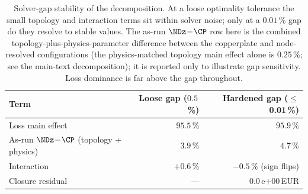 \begin{table}[t]
\centering
\caption{Solver-gap stability of the decomposition. At a loose optimality tolerance the
small topology and interaction terms sit within solver noise; only at a
$0.01$\,\% gap do they resolve to stable values. The as-run $\NDz\!-\!\CP$ row here is the
combined topology-plus-physics-parameter difference between the copperplate and node-resolved
configurations (the physics-matched topology main effect alone is $0.25$\,\%; see the main-text
decomposition); it is reported only to illustrate gap sensitivity. Loss dominance is far above the
gap throughout.}
\label{tab:gapstability}
\begin{tabular}{lrr}
\hline
Term & Loose gap ($0.5$\,\%) & Hardened gap ($\le$0.01\,\%) \\
\hline
Loss main effect & $95.5$\,\% & $95.9$\,\% \\
As-run $\NDz\!-\!\CP$ (topology + physics) & $3.9$\,\% & $4.7$\,\% \\
Interaction & $+0.6$\,\% & $-0.5$\,\% (sign flips) \\
Closure residual & --- & $0.0$\,e${+}00$\,EUR \\
\hline
\end{tabular}
\end{table}
